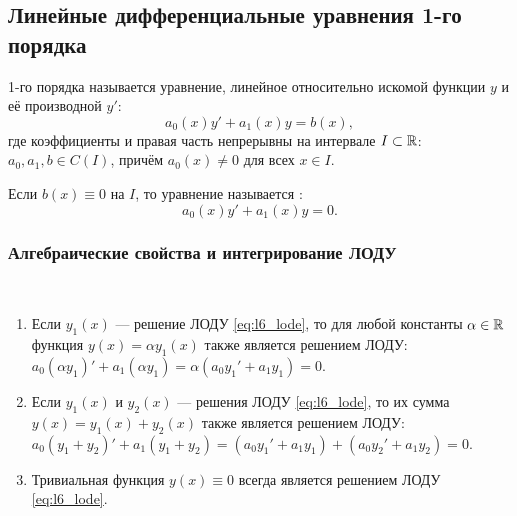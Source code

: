 \subsection{Линейные дифференциальные уравнения 1-го порядка}

\begin{definition}
     1-го
    порядка называется уравнение, линейное относительно искомой функции $y$ и
    её производной $y'$:
    \begin{equation} \label{eq:l6_lnde}
        a_0(x) y' + a_1(x) y = b(x), \tag{3}
    \end{equation}
    где коэффициенты и правая часть непрерывны на интервале $I \subset \mathbb{R}$:
    $a_0, a_1, b \in C(I)$, причём $a_0(x) \neq 0$ для всех $x \in I$.
\end{definition}

\begin{definition}
    Если $b(x) \equiv 0$ на $I$, то уравнение называется :
    \begin{equation} \label{eq:l6_lode}
        a_0(x) y' + a_1(x) y = 0. \tag{4}
    \end{equation}
\end{definition}

\subsubsection{Алгебраические свойства и интегрирование ЛОДУ}

\begin{properties} ~
    \begin{enumerate}
        \item Если $y_1(x)$ — решение ЛОДУ \eqref{eq:l6_lode}, то для любой
        константы $\alpha \in \mathbb{R}$ функция $y(x) = \alpha y_1(x)$ также
        является решением ЛОДУ:
        $a_0 (\alpha y_1)' + a_1 (\alpha y_1) = \alpha (a_0 y_1' + a_1 y_1) = 0$.
        \item Если $y_1(x)$ и $y_2(x)$ — решения ЛОДУ \eqref{eq:l6_lode}, то
        их сумма $y(x) = y_1(x) + y_2(x)$ также является решением ЛОДУ:
        $a_0(y_1 + y_2)' + a_1(y_1 + y_2) = (a_0 y_1' + a_1 y_1) +
        (a_0 y_2' + a_1 y_2) = 0$.
        \item Тривиальная функция $y(x) \equiv 0$ всегда является решением
        ЛОДУ \eqref{eq:l6_lode}.
    \end{enumerate}
\end{properties}

